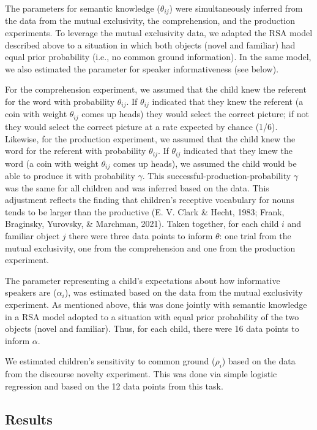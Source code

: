 \documentclass[
  man,floatsintext]{apa6}
\begin{document}
The parameters for semantic knowledge (\(\theta_{ij}\)) were simultaneously inferred from the data from the mutual exclusivity, the comprehension, and the production experiments. To leverage the mutual exclusivity data, we adapted the RSA model described above to a situation in which both objects (novel and familiar) had equal prior probability (i.e., no common ground information). In the same model, we also estimated the parameter for speaker informativeness (see below).

For the comprehension experiment, we assumed that the child knew the referent for the word with probability \(\theta_{ij}\). If \(\theta_{ij}\) indicated that they knew the referent (a coin with weight \(\theta_{ij}\) comes up heads) they would select the correct picture; if not they would select the correct picture at a rate expected by chance (1/6). Likewise, for the production experiment, we assumed that the child knew the word for the referent with probability \(\theta_{ij}\). If \(\theta_{ij}\) indicated that they knew the word (a coin with weight \(\theta_{ij}\) comes up heads), we assumed the child would be able to produce it with probability \(\gamma\). This successful-production-probability \(\gamma\) was the same for all children and was inferred based on the data. This adjustment reflects the finding that children's receptive vocabulary for nouns tends to be larger than the productive (E. V. Clark \& Hecht, 1983; Frank, Braginsky, Yurovsky, \& Marchman, 2021). Taken together, for each child \(i\) and familiar object \(j\) there were three data points to inform \(\theta\): one trial from the mutual exclusivity, one from the comprehension and one from the production experiment.

The parameter representing a child's expectations about how informative speakers are (\(\alpha_i\)), was estimated based on the data from the mutual exclusivity experiment. As mentioned above, this was done jointly with semantic knowledge in a RSA model adopted to a situation with equal prior probability of the two objects (novel and familiar). Thus, for each child, there were 16 data points to inform \(\alpha\).

We estimated children's sensitivity to common ground (\(\rho_i\)) based on the data from the discourse novelty experiment. This was done via simple logistic regression and based on the 12 data points from this task.

\hypertarget{results}{%
\subsection{Results}\label{results}}
\end{document}
